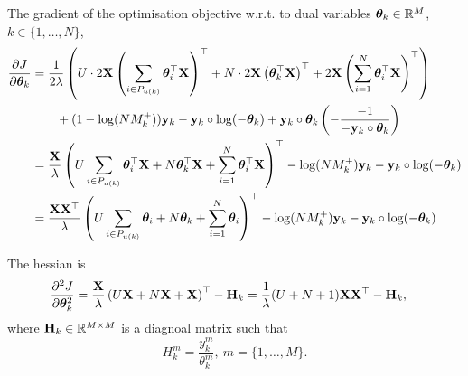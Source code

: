 The gradient of the optimisation objective w.r.t. to dual variables $\bm{\theta}_k \in \mathbb{R}^{M}$, $k \in \{1,\dots,N\}$,
\begin{equation*}
\begin{aligned}
\frac{\partial J}{\partial \bm{\theta}_k}
&= \frac{1}{2 \lambda} \left( U \cdot 2 \mathbf{X} \left(\sum_{i \in P_{u(k)}} \bm{\theta}_i^\top \mathbf{X} \right)^\top 
   + N \cdot 2 \mathbf{X} \left( \bm{\theta}_k^\top \mathbf{X} \right)^\top
   + 2 \mathbf{X} \left(\sum_{i=1}^N \bm{\theta}_i^\top \mathbf{X} \right)^\top \right) \\
& \hspace{2em}
   + (1 - \log(N M_k^+)) \mathbf{y}_k - \mathbf{y}_k \circ \log(-\bm{\theta}_k) + \mathbf{y}_k \circ \bm{\theta}_k \left( -\frac{-1}{-\mathbf{y}_k \circ \bm{\theta}_k} \right) \\
&= \frac{\mathbf{X}}{\lambda} \left( U \sum_{i \in P_{u(k)}} \bm{\theta}_i^\top \mathbf{X} 
   + N \bm{\theta}_k^\top \mathbf{X} 
   + \sum_{i=1}^N \bm{\theta}_i^\top \mathbf{X} \right)^\top
   - \log(N M_k^+) \mathbf{y}_k - \mathbf{y}_k \circ \log(-\bm{\theta}_k) \\
&= \frac{\mathbf{X} \mathbf{X}^\top}{\lambda} \left( U \sum_{i \in P_{u(k)}} \bm{\theta}_i + N \bm{\theta}_k + \sum_{i=1}^N \bm{\theta}_i \right)^\top
   - \log(N M_k^+) \mathbf{y}_k - \mathbf{y}_k \circ \log(-\bm{\theta}_k) \\
\end{aligned}
\end{equation*}

The hessian is
\begin{equation*}
\begin{aligned}
\frac{\partial^2 J}{\partial \bm{\theta}_k^2}
&= \frac{\mathbf{X}}{\lambda} \left( U \mathbf{X} + N \mathbf{X} + \mathbf{X} \right)^\top - \mathbf{H}_k
 = \frac{1}{\lambda} (U + N + 1) \mathbf{X} \mathbf{X}^\top - \mathbf{H}_k,
\end{aligned}
\end{equation*}
where $\mathbf{H}_k \in \mathbb{R}^{M \times M}$ is a diagnoal matrix such that
\begin{equation*}
H_k^m = \frac{y_k^m}{\theta_k^m}, \ m = \{1,\dots,M\}.
\end{equation*}
